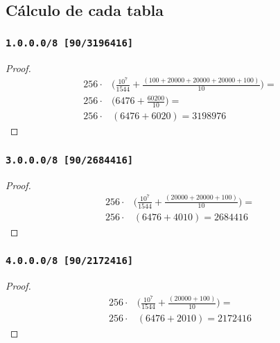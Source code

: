 \documentclass[12pt, times]{simauth}
\begin{document}
\subsection{Cálculo de cada tabla}
\begin{minipage}[t]{0.45\linewidth}
\subsubsection{\texttt{1.0.0.0/8 [90/3196416]}}
\begin{proof}
    \begin{align*}
        256 \cdot & \bigg(\frac{10^7}{1544} + \frac{(100 + 20000 + 20000 + 20000 + 100)}{10}\bigg) = \\
        256 \cdot & \bigg(6476 + \frac{60200}{10} \bigg) = \\
        256 \cdot & (6476 + 6020) = 3198976
    \end{align*}
\end{proof}
\subsubsection{\texttt{3.0.0.0/8 [90/2684416]}}
\begin{proof}
    \begin{align*}
        256 \cdot & \bigg(\frac{10^7}{1544} + \frac{(20000 + 20000 + 100)}{10}\bigg) = \\
        256 \cdot & (6476 + 4010) = 2684416
    \end{align*}
\end{proof}
\subsubsection{\texttt{4.0.0.0/8 [90/2172416]}}
\begin{proof}
    \begin{align*}
        256 \cdot & \bigg(\frac{10^7}{1544} + \frac{(20000 + 100)}{10}\bigg) = \\
        256 \cdot & (6476 + 2010) = 2172416
    \end{align*}
\end{proof}
\end{minipage} \hfill
\end{document}
